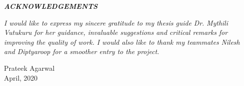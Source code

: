%
%


\begin{center}
\begin{large}
{\it{\bf ACKNOWLEDGEMENTS} }
\end{large}
\end{center} 
\textit{I would like to express my sincere gratitude to my thesis guide Dr. Mythili Vutukuru for her guidance, invaluable suggestions and critical remarks for improving the quality of work. I would also like to thank my teammates Nilesh and Diptyaroop for a smoother entry to the project.}



\vskip 0.5in
\begin{flushright}
Prateek Agarwal\\
April, 2020
\end{flushright}
